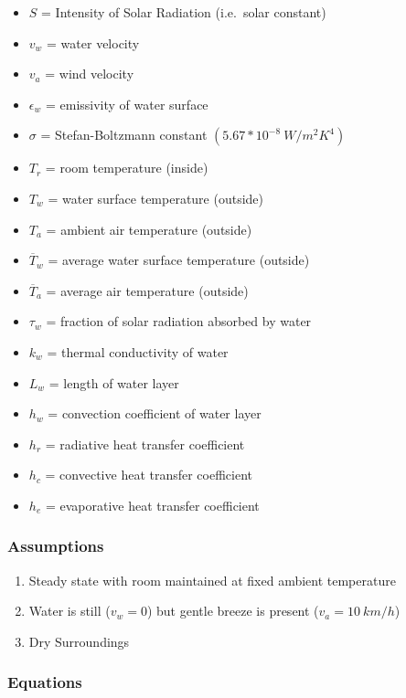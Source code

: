 \documentclass[11pt]{article}
\providecommand{\tightlist}{%
      \setlength{\itemsep}{0pt}\setlength{\parskip}{0pt}}
\begin{document}
\begin{itemize}
\tightlist
\item
  \(S\) = Intensity of Solar Radiation (i.e.~solar constant)
\item
  \(v_w\) = water velocity
\item
  \(v_a\) = wind velocity
\item
  \(\epsilon_w\) = emissivity of water surface
\item
  \(\sigma\) = Stefan-Boltzmann constant \((5.67*10^{-8}\ W/m^2K^4)\)
\item
  \(T_r\) = room temperature (inside)
\item
  \(T_w\) = water surface temperature (outside)
\item
  \(T_a\) = ambient air temperature (outside)
\item
  \(\overline T_w\) = average water surface temperature (outside)
\item
  \(\overline T_a\) = average air temperature (outside)
\item
  \(\tau_w\) = fraction of solar radiation absorbed by water
\item
  \(k_w\) = thermal conductivity of water
\item
  \(L_w\) = length of water layer
\item
  \(h_w\) = convection coefficient of water layer
\item
  \(h_r\) = radiative heat transfer coefficient
\item
  \(h_c\) = convective heat transfer coefficient
\item
  \(h_e\) = evaporative heat transfer coefficient
\end{itemize}

    \hypertarget{assumptions}{%
\subsubsection{Assumptions}\label{assumptions}}

\begin{enumerate}
\def\labelenumi{\arabic{enumi}.}
\tightlist
\item
  Steady state with room maintained at fixed ambient temperature
\item
  Water is still (\(v_w = 0\)) but gentle breeze is present
  (\(v_a = 10\ km/h\))
\item
  Dry Surroundings
\end{enumerate}

    \hypertarget{equations}{%
\subsubsection{Equations}\label{equations}}
\end{document}
